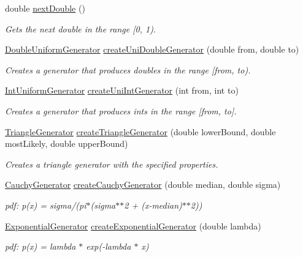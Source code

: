 \begin{DoxyCompactItemize}
double \hyperlink{classrepast_1_1_random_aac8516b6a9f9005013dafc82034ce2e3}{next\-Double} ()
\begin{DoxyCompactList}\small\item\em Gets the next double in the range \mbox{[}0, 1). \end{DoxyCompactList}\item 
\hyperlink{classrepast_1_1_default_number_generator}{Double\-Uniform\-Generator} \hyperlink{classrepast_1_1_random_a5017a5f8427219f9e0d487f4ae2b215d}{create\-Uni\-Double\-Generator} (double from, double to)
\begin{DoxyCompactList}\small\item\em Creates a generator that produces doubles in the range \mbox{[}from, to). \end{DoxyCompactList}\item 
\hyperlink{classrepast_1_1_default_number_generator}{Int\-Uniform\-Generator} \hyperlink{classrepast_1_1_random_a5263c2b66369177674e2d223d5ff7945}{create\-Uni\-Int\-Generator} (int from, int to)
\begin{DoxyCompactList}\small\item\em Creates a generator that produces ints in the range \mbox{[}from, to\mbox{]}. \end{DoxyCompactList}\item 
\hyperlink{classrepast_1_1_default_number_generator}{Triangle\-Generator} \hyperlink{classrepast_1_1_random_a405c6638702359ebc0038dc309a73a45}{create\-Triangle\-Generator} (double lower\-Bound, double most\-Likely, double upper\-Bound)
\begin{DoxyCompactList}\small\item\em Creates a triangle generator with the specified properties. \end{DoxyCompactList}\item 
\hyperlink{classrepast_1_1_default_number_generator}{Cauchy\-Generator} \hyperlink{classrepast_1_1_random_a59e3fefc2dc6406b25ad00c0250ca12e}{create\-Cauchy\-Generator} (double median, double sigma)
\begin{DoxyCompactList}\small\item\em pdf\-: p(x) = sigma/(pi$\ast$(sigma$\ast$$\ast$2 + (x-\/median)$\ast$$\ast$2)) \end{DoxyCompactList}\item 
\hyperlink{classrepast_1_1_default_number_generator}{Exponential\-Generator} \hyperlink{classrepast_1_1_random_a223f65315bcc4a07087116719b5fa251}{create\-Exponential\-Generator} (double lambda)
\begin{DoxyCompactList}\small\item\em pdf\-: p(x) = lambda $\ast$ exp(-\/lambda $\ast$ x) \end{DoxyCompactList}\item 

\end{DoxyCompactItemize}
